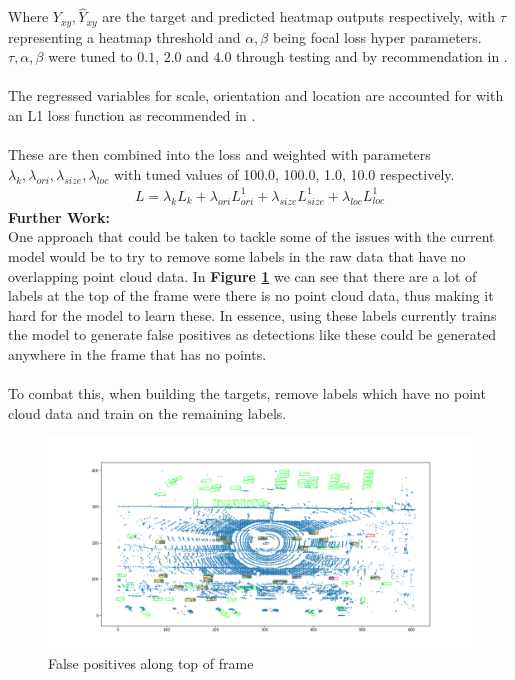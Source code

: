 \documentclass[letter]{article}
\newcommand{\fref}[1]{\textbf{Figure \ref{#1}}}
\begin{document}
	Where $Y_{xy}, \hat{Y}_{xy}$ are the target and predicted heatmap outputs respectively, with $\tau$ representing a heatmap threshold and $\alpha, \beta$ being focal loss hyper parameters. $\tau, \alpha, \beta$ were tuned to $0.1$, $2.0$ and $4.0$ through testing and by recommendation in \cite{objects-as-points}. \\\\
	The regressed variables for scale, orientation and location are accounted for with an L1 loss function as recommended in \cite{objects-as-points}.\\\\
	These are then combined into the loss and weighted with parameters $\lambda_{k}, \lambda_{ori}, \lambda_{size}, \lambda_{loc}$ with tuned values of 100.0, 100.0, 1.0, 10.0 respectively.
	\begin{align}
		L = \lambda_k L_k + \lambda_{ori} L^1_{ori} + \lambda_{size} L^1_{size} + \lambda_{loc} L^1_{loc}
	\end{align}
	\textbf{Further Work:}\\
	One approach that could be taken to tackle some of the issues with the current model would be to try to remove some labels in the raw data that have no overlapping point cloud data. In \fref{fig:false-positive} we can see that there are a lot of labels at the top of the frame were there is no point cloud data, thus making it hard for the model to learn these. In essence, using these labels currently trains the model to generate false positives as detections like these could be generated anywhere in the frame that has no points.\\\\
	To combat this, when building the targets, remove labels which have no point cloud data and train on the remaining labels.
	\begin{figure}[h]
		\centering
		\includegraphics[scale=0.35]{images/false-positives.png}
		\caption{False positives along top of frame}
		\label{fig:false-positive}
	\end{figure}
\end{document}
